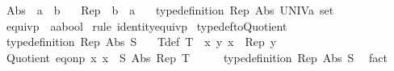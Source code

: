 \begin{isabellebody}
\ \ \ Abs\ {\isacharcolon}{\kern0pt}{\isacharcolon}{\kern0pt}\ {\isachardoublequoteopen}{\isacharprime}{\kern0pt}a\ {\isasymRightarrow}\ {\isacharprime}{\kern0pt}b{\isachardoublequoteclose}\isanewline
\ \ \ Rep\ {\isacharcolon}{\kern0pt}{\isacharcolon}{\kern0pt}\ {\isachardoublequoteopen}{\isacharprime}{\kern0pt}b\ {\isasymRightarrow}\ {\isacharprime}{\kern0pt}a{\isachardoublequoteclose}\isanewline
\ \ \ {\isachardoublequoteopen}type{\isacharunderscore}{\kern0pt}definition\ Rep\ Abs\ {\isacharparenleft}{\kern0pt}UNIV{\isacharcolon}{\kern0pt}{\isacharcolon}{\kern0pt}{\isacharprime}{\kern0pt}a\ set{\isacharparenright}{\kern0pt}{\isachardoublequoteclose}\isanewline
\ \ \ {\isachardoublequoteopen}equivp\ {\isacharparenleft}{\kern0pt}{\isacharparenleft}{\kern0pt}{\isacharequal}{\kern0pt}{\isacharparenright}{\kern0pt}\ {\isacharcolon}{\kern0pt}{\isacharcolon}{\kern0pt}{\isacharprime}{\kern0pt}a{\isasymRightarrow}{\isacharprime}{\kern0pt}a{\isasymRightarrow}bool{\isacharparenright}{\kern0pt}{\isachardoublequoteclose}\isanewline
%
\isadelimproof
%
\endisadelimproof
%
\isatagproof
{}\isamarkupfalse%
\ {\isacharparenleft}{\kern0pt}rule\ identity{\isacharunderscore}{\kern0pt}equivp{\isacharparenright}{\kern0pt}%
\endisatagproof
{\isafoldproof}%
%
\isadelimproof
\isanewline
%
\endisadelimproof
\isanewline
{}\isamarkupfalse%
\ typedef{\isacharunderscore}{\kern0pt}to{\isacharunderscore}{\kern0pt}Quotient{\isacharcolon}{\kern0pt}\isanewline
\ \ \ {\isachardoublequoteopen}type{\isacharunderscore}{\kern0pt}definition\ Rep\ Abs\ S{\isachardoublequoteclose}\isanewline
\ \ \ T{\isacharunderscore}{\kern0pt}def{\isacharcolon}{\kern0pt}\ {\isachardoublequoteopen}T\ {\isasymequiv}\ {\isacharparenleft}{\kern0pt}{\isasymlambda}x\ y{\isachardot}{\kern0pt}\ x\ {\isacharequal}{\kern0pt}\ Rep\ y{\isacharparenright}{\kern0pt}{\isachardoublequoteclose}\isanewline
\ \ \ {\isachardoublequoteopen}Quotient\ {\isacharparenleft}{\kern0pt}eq{\isacharunderscore}{\kern0pt}onp\ {\isacharparenleft}{\kern0pt}{\isasymlambda}x{\isachardot}{\kern0pt}\ x\ {\isasymin}\ S{\isacharparenright}{\kern0pt}{\isacharparenright}{\kern0pt}\ Abs\ Rep\ T{\isachardoublequoteclose}\isanewline
%
\isadelimproof
%
\endisadelimproof
%
\isatagproof
{}\isamarkupfalse%
\ {\isacharminus}{\kern0pt}\isanewline
\ \ \isamarkupfalse%
\ type{\isacharunderscore}{\kern0pt}definition\ Rep\ Abs\ S\ \isamarkupfalse%
\ fact\isanewline

\end{isabellebody}
